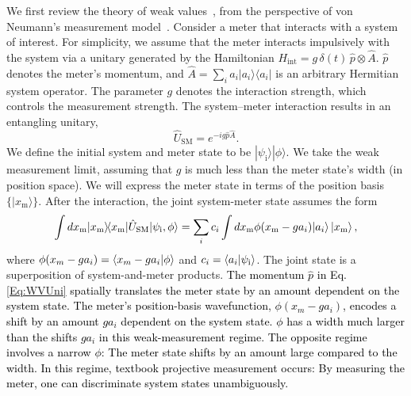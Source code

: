 \documentclass[%
 reprint,
superscriptaddress,
nofootinbib,
bibnotes,
 amsmath,amssymb,
 aps,
]{revtex4-1}
\theoremstyle{plain}
\newcommand*{\ketbra}[2]{\lvert #1 \rangle\!\langle #2 \rvert}
\newcommand{\nicole}[1]{\textcolor{black}{#1} }
\def\ra{\rangle}
\def\be{\begin{equation}}
\def\ee{\end{equation}}
\begin{document}
We first review the theory of weak  values~\cite{Aharanov88,Duck89, Tamir13, Dressel14}, from the perspective of  von Neumann's measurement model~\cite{Neumann18}. 
Consider a meter that interacts with a system of interest. For simplicity, we assume that the meter interacts impulsively with the system  via a unitary generated by the Hamiltonian $H_{\mathrm{int}} = g \, \delta(t) \, {\hat p}\otimes {\hat A}$. ${\hat p}$ denotes the meter's momentum, and $\hat A = \sum_i a_i \ketbra{a_i}{a_i}$ is 
an arbitrary Hermitian system operator. The parameter $g$ denotes the interaction strength, which controls the measurement strength. The system--meter interaction results in an entangling unitary,
\be
\label{Eq:WVUni}
{\hat U}_{\mathrm{SM}} = e^{-i g {\hat p} {\hat A} }.
\ee
We define the initial system and meter state to be $ |\psi_{\mathrm{i}}\ra |\phi\ra$.
We take the weak measurement limit, assuming that $g$ is much less than the meter state's width (in position space).  
We will express the meter state in terms of the position basis $\{ |x_{\mathrm{m}} \ra\} $. After the interaction, the joint system-meter state assumes the form 
\be
\int dx_{\mathrm{m}}  
\ketbra{x_{\mathrm{m}}}{ x_{\mathrm{m}} } {\hat U}_{\mathrm{SM}} |\psi_{\mathrm{i}}, \phi\ra = \sum_i c_i \int dx_{\mathrm{m}}  \phi(x_{\mathrm{m}} - g a_i) |a_i \ra  \ket{x_{\mathrm{m}}} , \label{normshift}
\ee
where $\phi(x_m - g a_i) = \braket{x_m - g a_i | \phi}$ and $c_i = \braket{a_i | \psi_{\mathrm{i}}}$.
The joint state is a superposition of system-and-meter products.
\nicole{The momentum ${\hat p}$ in Eq.  \eqref{Eq:WVUni} spatially translates the meter state by an amount dependent on the system state. The meter's position-basis wavefunction, $\phi(x_m - g a_i)$, encodes a shift by an amount $g a_i$ dependent on the system state.  
$\phi$ has a width much larger than the shifts $g a_i$ in this weak-measurement regime.
The opposite regime involves a narrow $\phi$: The meter state shifts by an amount large compared to the width. In this regime, textbook projective measurement occurs: By measuring the meter, one can discriminate system states unambiguously.   }
\end{document}

